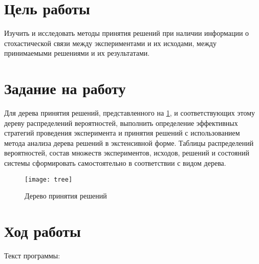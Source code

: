 \documentclass[a4paper,14pt]{extarticle}
\begin{document}


\section{Цель работы}
Изучить и исследовать методы принятия решений при наличии информации о
стохастической связи между экспериментами и их исходами, между принимаемыми
решениями и их результатами.

\section{Задание на работу}
Для дерева принятия решений, представленного на \ref{fig:tree}, и
соответствующих этому дереву распределений вероятностей, выполнить определение
эффективных стратегий проведения эксперимента и принятия решений с
использованием метода анализа дерева решений в экстенсивной форме. Таблицы
распределений вероятностей, состав множеств экспериментов, исходов, решений и
состояний системы сформировать самостоятельно в соответствии с видом дерева.

\begin{figure}[H]
    \centering
    \texttt{[image: tree]}
    \caption{Дерево принятия решений}
    \label{fig:tree}
\end{figure}
\pagebreak

\section{Ход работы}
Текст программы:
\end{document}
